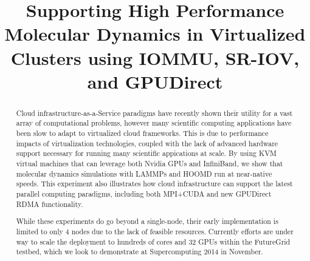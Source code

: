 \documentclass[times,10pt,twocolumn,conference]{IEEEtran}
\begin{document}



\title{Supporting High Performance Molecular Dynamics in Virtualized Clusters using IOMMU, SR-IOV, and GPUDirect}
\author{
\and
{}
\and
{}
}


\maketitle

\begin{abstract}

Cloud infrastructure-as-a-Service paradigms have recently shown their utility for a vast array of computational problems, however many scientific computing applications have been slow to adapt to virtualized cloud frameworks. This is due to performance impacts of virtualization technologies, coupled with the lack of advanced hardware support necessary for running many scientific appications at scale. By using KVM virtual machines that can leverage both Nvidia GPUs and InfiniBand, we show that molecular dynamics simulations with LAMMPs and HOOMD run at near-native speeds. This experiment also illustrates how cloud infrastructure can support the latest parallel computing paradigms, including both MPI+CUDA and new GPUDirect RDMA functionality.

While these experiments do go beyond a single-node, their early implementation is limited to only 4 nodes due to the lack of feasible resources. Currently efforts are under way to scale the deployment to hundreds of cores and 32 GPUs within the FutureGrid testbed, which we look to demonstrate at Supercomputing 2014 in November. 
 



\end{abstract}
\end{document}
